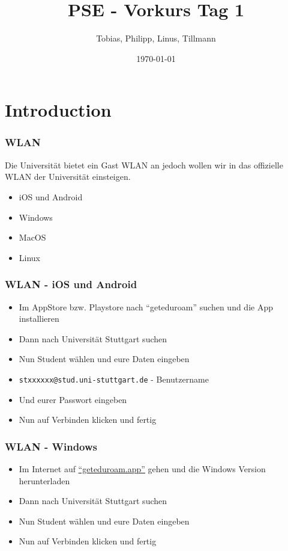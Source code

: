 \documentclass{../../presentation}
\title{PSE - Vorkurs Tag 1}
\author{Tobias, Philipp, Linus, Tillmann}
\institute{FIUS - Fachgruppe Informatik Universität Stuttgart}
\date{\today}
\begin{document}
\begin{frame}
  \titlepage
\end{frame}

\begin{frame}
  \listoftodos
\end{frame}

\section{Introduction}

\begin{frame}
\end{frame}

\begin{frame}[fragile]
  \frametitle{WLAN}
  Die Universität bietet ein Gast WLAN an jedoch wollen wir in das offizielle WLAN der Universität einsteigen.
  \newline
  \begin{itemize}
    \item iOS und Android
    \item Windows
    \item MacOS
    \item Linux
  \end{itemize}
\end{frame}

\begin{frame}[fragile]
  \frametitle{WLAN - iOS und Android}
  \begin{itemize}
    \item Im AppStore bzw. Playstore nach \enquote{geteduroam} suchen und die App installieren
    \item Dann nach Universität Stuttgart suchen
    \item Nun Student wählen und eure Daten eingeben
    \item \texttt{stxxxxxx@stud.uni-stuttgart.de} - Benutzername
    \item Und eurer Passwort eingeben
    \item Nun auf Verbinden klicken und fertig
  \end{itemize}
\end{frame}

\begin{frame}[fragile]
  \frametitle{WLAN - Windows}
  \begin{itemize}
    \item Im Internet auf \href{https://geteduroam.app}{\enquote{geteduroam.app}} gehen und die Windows Version herunterladen
    \item Dann nach Universität Stuttgart suchen
    \item Nun Student wählen und eure Daten eingeben
    \item Nun auf Verbinden klicken und fertig
  \end{itemize}
\end{frame}
\end{document}
